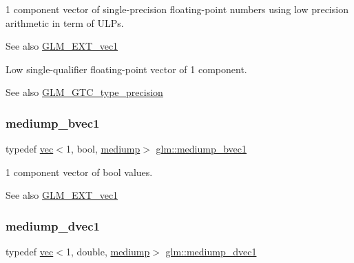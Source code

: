 1 component vector of single-\/precision floating-\/point numbers using low precision arithmetic in term of U\+L\+Ps.

\begin{DoxySeeAlso}{See also}
\mbox{\hyperlink{group__ext__vec1}{G\+L\+M\+\_\+\+E\+X\+T\+\_\+vec1}}
\end{DoxySeeAlso}
Low single-\/qualifier floating-\/point vector of 1 component. \begin{DoxySeeAlso}{See also}
\mbox{\hyperlink{group__gtc__type__precision}{G\+L\+M\+\_\+\+G\+T\+C\+\_\+type\+\_\+precision}} 
\end{DoxySeeAlso}
\mbox{\label{group__ext__vec1_ga1e19a89e380de140b1496a824d306155}} 
\subsubsection{\texorpdfstring{mediump\+\_\+bvec1}{mediump\_bvec1}}
{\footnotesize\ttfamily typedef \mbox{\hyperlink{structglm_1_1vec}{vec}}$<$1, bool, \mbox{\hyperlink{namespaceglm_a36ed105b07c7746804d7fdc7cc90ff25a6416f3ea0c9025fb21ed50c4d6620482}{mediump}}$>$ \mbox{\hyperlink{group__ext__vec1_ga1e19a89e380de140b1496a824d306155}{glm\+::mediump\+\_\+bvec1}}}

1 component vector of bool values.

\begin{DoxySeeAlso}{See also}
\mbox{\hyperlink{group__ext__vec1}{G\+L\+M\+\_\+\+E\+X\+T\+\_\+vec1}} 
\end{DoxySeeAlso}
\mbox{\label{group__ext__vec1_gabfbd2538da41381bc96ee634944b9a28}} 
\subsubsection{\texorpdfstring{mediump\+\_\+dvec1}{mediump\_dvec1}}
{\footnotesize\ttfamily typedef \mbox{\hyperlink{structglm_1_1vec}{vec}}$<$1, double, \mbox{\hyperlink{namespaceglm_a36ed105b07c7746804d7fdc7cc90ff25a6416f3ea0c9025fb21ed50c4d6620482}{mediump}}$>$ \mbox{\hyperlink{group__ext__vec1_gabfbd2538da41381bc96ee634944b9a28}{glm\+::mediump\+\_\+dvec1}}}

